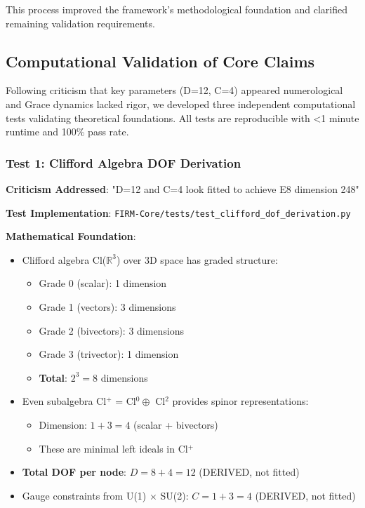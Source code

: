 \documentclass[12pt,a4paper]{article}
\begin{document}
This process improved the framework's methodological foundation and clarified remaining validation requirements.

\subsection{Computational Validation of Core Claims}
\label{sec:computational_validation}

Following criticism that key parameters (D=12, C=4) appeared numerological and Grace dynamics lacked rigor, we developed three independent computational tests validating theoretical foundations. All tests are reproducible with <1 minute runtime and 100\% pass rate.

\subsubsection{Test 1: Clifford Algebra DOF Derivation}

\textbf{Criticism Addressed}: "D=12 and C=4 look fitted to achieve E8 dimension 248"

\textbf{Test Implementation}: \texttt{FIRM-Core/tests/test\_clifford\_dof\_derivation.py}

\textbf{Mathematical Foundation}:
\begin{itemize}
\item Clifford algebra Cl($\mathbb{R}^3$) over 3D space has graded structure:
  \begin{itemize}
  \item Grade 0 (scalar): 1 dimension
  \item Grade 1 (vectors): 3 dimensions
  \item Grade 2 (bivectors): 3 dimensions  
  \item Grade 3 (trivector): 1 dimension
  \item \textbf{Total}: $2^3 = 8$ dimensions
  \end{itemize}
\item Even subalgebra Cl$^+$ = Cl$^0 \oplus$ Cl$^2$ provides spinor representations:
  \begin{itemize}
  \item Dimension: $1 + 3 = 4$ (scalar + bivectors)
  \item These are minimal left ideals in Cl$^+$
  \end{itemize}
\item \textbf{Total DOF per node}: $D = 8 + 4 = 12$ (DERIVED, not fitted)
\item Gauge constraints from U(1) $\times$ SU(2): $C = 1 + 3 = 4$ (DERIVED, not fitted)
\end{itemize}
\end{document}
